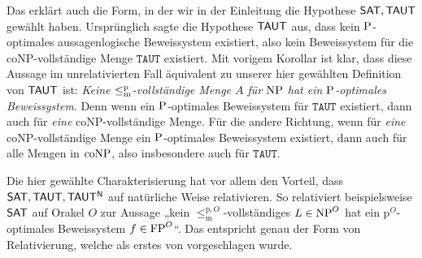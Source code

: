 Das erklärt auch die Form, in der wir in der Einleitung die Hypothese $\hSAT, \hTAUT$ gewählt haben.
Ursprünglich sagte die Hypothese $\hTAUT$ aus, dass kein $\P$-optimales aussagenlogische Beweissystem existiert, also kein Beweissystem für die coNP-vollständige Menge $\mathtt{TAUT}$ existiert.
Mit vorigem Korollar ist klar, dass diese Aussage im unrelativierten Fall äquivalent zu unserer hier gewählten Definition von $\hTAUT$ ist: \emph{Keine $\leqmp$-vollständige Menge $A$ für $\NP$ hat ein $\P$-optimales Beweissystem}.
Denn wenn ein $\P$-optimales Beweissystem für $\mathtt{TAUT}$ existiert, dann auch für \emph{eine} coNP-vollständige Menge.
Für die andere Richtung, wenn für \emph{eine} coNP-vollständige Menge ein $\P$-optimales Beweissystem existiert, dann auch für alle Mengen in $\coNP$, also insbesondere auch für $\mathtt{TAUT}$.
%

Die hier gewählte Charakterisierung hat vor allem den Vorteil, dass $\hSAT, \hTAUT, \mathsf{TAUT^N}$ auf natürliche Weise relativieren.
So relativiert beispielsweise $\hSAT$ auf Orakel $O$ zur Aussage „kein $\leq_\mathrm{m}^{\mathrm p,O}$-vollständiges $L\in\NP^O$ hat ein p${}^O$-optimales Beweissystem $f\in\FP^O$“.
Das entspricht genau der Form von Relativierung, welche als erstes von \textcite{dose_oracle_2020} vorgeschlagen wurde.




